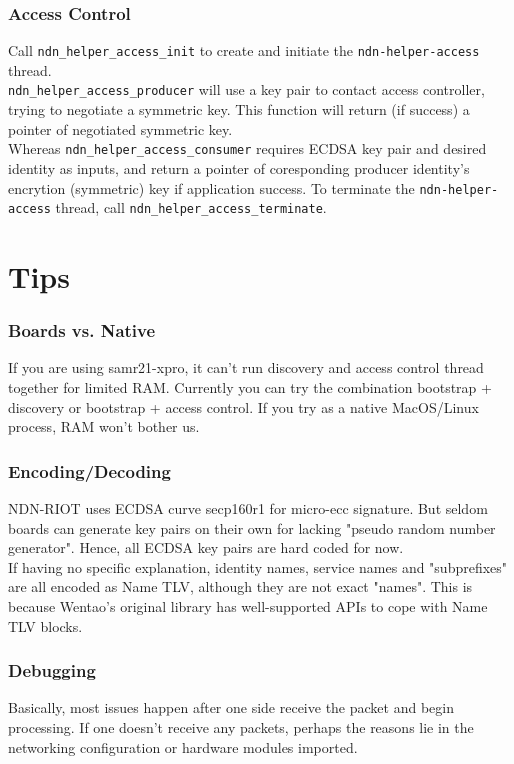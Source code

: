 \documentclass[a4paper, 11pt]{article}
\begin{document}
        \subsubsection*{Access Control}
        Call \texttt{ndn\_helper\_access\_init} to create and initiate the \texttt{ndn-helper-access} thread. \\ \texttt{ndn\_helper\_access\_producer} will use a key pair to contact access controller, trying to negotiate a symmetric key. This function will return (if success) a pointer of negotiated symmetric key.  \\ Whereas \texttt{ndn\_helper\_access\_consumer} requires ECDSA key pair and desired identity as inputs, and return a pointer of coresponding producer identity's encrytion (symmetric) key if application success. To terminate the \texttt{ndn-helper-access} thread, call \texttt{ndn\_helper\_access\_terminate}.             

        \section*{Tips}
        \subsubsection*{Boards vs. Native}
        If you are using samr21-xpro, it can't run discovery and access control thread together for limited RAM. Currently you can try the combination bootstrap + discovery or bootstrap + access control. If you try as a native MacOS/Linux process, RAM won't bother us.
        
        \subsubsection*{Encoding/Decoding}
        NDN-RIOT uses ECDSA curve secp160r1 for micro-ecc signature. But seldom boards can generate key pairs on their own for lacking "pseudo random number generator". Hence, all ECDSA key pairs are hard coded for now. \\
        If having no specific explanation, identity names, service names and "subprefixes" are all encoded as Name TLV, although they are not exact "names". This is because Wentao's original library has well-supported APIs to cope with Name TLV blocks.

        \subsubsection*{Debugging}
        Basically, most issues happen after one side receive the packet and begin processing. If one doesn't receive any packets, perhaps the reasons lie in the networking configuration or hardware modules imported.
        
\end{document}
